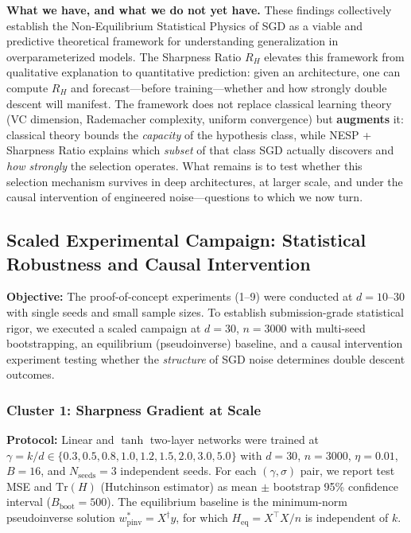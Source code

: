 \documentclass[
  journal=largetwo,
  simfonts=false,
  year=2025,
  volume=37,
]{cup-journal}
\begin{document}
\medskip
\noindent\textbf{What we have, and what we do not yet have.} These findings collectively establish the Non-Equilibrium Statistical Physics of SGD as a viable and predictive theoretical framework for understanding generalization in overparameterized models. The Sharpness Ratio $R_H$ elevates this framework from qualitative explanation to quantitative prediction: given an architecture, one can compute $R_H$ and forecast---before training---whether and how strongly double descent will manifest. The framework does not replace classical learning theory (VC dimension, Rademacher complexity, uniform convergence) but \textbf{augments} it: classical theory bounds the \textit{capacity} of the hypothesis class, while NESP + Sharpness Ratio explains which \textit{subset} of that class SGD actually discovers and \textit{how strongly} the selection operates. What remains is to test whether this selection mechanism survives in deep architectures, at larger scale, and under the causal intervention of engineered noise---questions to which we now turn.

\subsection{Scaled Experimental Campaign: Statistical Robustness and Causal Intervention}

\textbf{Objective:} The proof-of-concept experiments (1--9) were conducted at $d = 10$--$30$ with single seeds and small sample sizes. To establish submission-grade statistical rigor, we executed a scaled campaign at $d=30$, $n=3000$ with multi-seed bootstrapping, an equilibrium (pseudoinverse) baseline, and a causal intervention experiment testing whether the \textit{structure} of SGD noise determines double descent outcomes.

\subsubsection{Cluster 1: Sharpness Gradient at Scale}

\textbf{Protocol:} Linear and $\tanh$ two-layer networks were trained at $\gamma = k/d \in \{0.3, 0.5, 0.8, 1.0, 1.2, 1.5, 2.0, 3.0, 5.0\}$ with $d=30$, $n=3000$, $\eta=0.01$, $B=16$, and $N_{\mathrm{seeds}}=3$ independent seeds. For each $(\gamma, \sigma)$ pair, we report test MSE and $\mathrm{Tr}(H)$ (Hutchinson estimator) as mean $\pm$ bootstrap 95\% confidence interval ($B_{\mathrm{boot}}=500$). The equilibrium baseline is the minimum-norm pseudoinverse solution $w^*_{\mathrm{pinv}} = X^\dagger y$, for which $H_{\mathrm{eq}} = X^\top X / n$ is independent of $k$.
\end{document}

